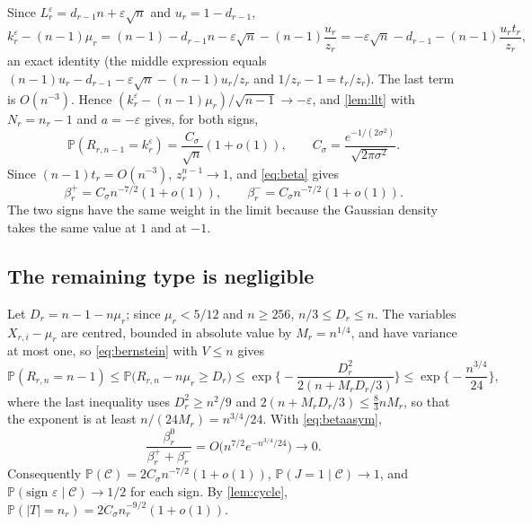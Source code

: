 \documentclass[11pt]{amsart}
\theoremstyle{definition}
\newcommand{\Prob}{\mathbb{P}}
\newcommand{\Cond}{\mathcal{C}}
\begin{document}
Since $L_r^\varepsilon=d_{r-1}n+\varepsilon\sqrt n$ and $u_r=1-d_{r-1}$,
\begin{equation}\label{eq:center}
k_r^\varepsilon-(n-1)\mu_r
=(n-1)-d_{r-1}n-\varepsilon\sqrt n-(n-1)\frac{u_r}{z_r}
=-\varepsilon\sqrt n-d_{r-1}-(n-1)\frac{u_rt_r}{z_r},
\end{equation}
an exact identity (the middle expression equals $(n-1)u_r-d_{r-1}-\varepsilon\sqrt n-(n-1)u_r/z_r$ and $1/z_r-1=t_r/z_r$). The last term is $O(n^{-3})$. Hence $(k_r^\varepsilon-(n-1)\mu_r)/\sqrt{n-1}\to-\varepsilon$, and \cref{lem:llt} with $N_r=n_r-1$ and $a=-\varepsilon$ gives, for both signs,
\begin{equation}\label{eq:localprob}
\Prob(R_{r,n-1}=k_r^\varepsilon)=\frac{C_\sigma}{\sqrt n}(1+o(1)),\qquad C_\sigma=\frac{e^{-1/(2\sigma^2)}}{\sqrt{2\pi\sigma^2}}.
\end{equation}
Since $(n-1)t_r=O(n^{-3})$, $z_r^{n-1}\to1$, and \eqref{eq:beta} gives
\begin{equation}\label{eq:betaasym}
\beta_r^+=C_\sigma n^{-7/2}(1+o(1)),\qquad\beta_r^-=C_\sigma n^{-7/2}(1+o(1)).
\end{equation}
The two signs have the same weight in the limit because the Gaussian density takes the same value at $1$ and at $-1$.

\subsection{The remaining type is negligible}

Let $D_r=n-1-n\mu_r$; since $\mu_r<5/12$ and $n\ge256$, $n/3\le D_r\le n$. The variables $X_{r,i}-\mu_r$ are centred, bounded in absolute value by $M_r=n^{1/4}$, and have variance at most one, so \eqref{eq:bernstein} with $V\le n$ gives
\[
\Prob(R_{r,n}=n-1)\le\Prob\big(R_{r,n}-n\mu_r\ge D_r\big)\le\exp\Big\{-\frac{D_r^2}{2(n+M_rD_r/3)}\Big\}\le\exp\Big\{-\frac{n^{3/4}}{24}\Big\},
\]
where the last inequality uses $D_r^2\ge n^2/9$ and $2(n+M_rD_r/3)\le\tfrac83nM_r$, so that the exponent is at least $n/(24M_r)=n^{3/4}/24$. With \eqref{eq:betaasym},
\begin{equation}\label{eq:negl}
\frac{\beta_r^0}{\beta_r^++\beta_r^-}=O\Big(n^{7/2}e^{-n^{3/4}/24}\Big)\longrightarrow0 .
\end{equation}
Consequently $\Prob(\Cond)=2C_\sigma n^{-7/2}(1+o(1))$, $\Prob(J=1\mid\Cond)\to1$, and $\Prob(\text{sign }\varepsilon\mid\Cond)\to1/2$ for each sign. By \cref{lem:cycle}, $\Prob(|T|=n_r)=2C_\sigma n_r^{-9/2}(1+o(1))$.
\end{document}
